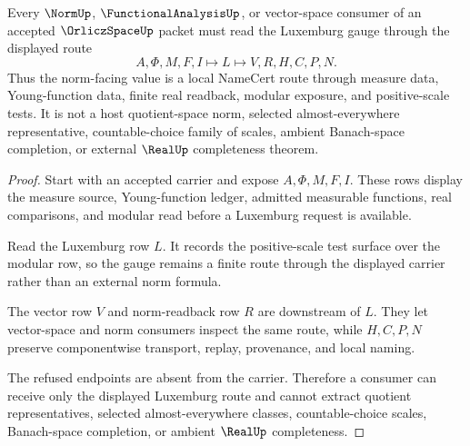 \begin{theorem}
\label{thm:orlicz-space-luxemburg-route}
Every $\NormUp$, $\FunctionalAnalysisUp$, or vector-space consumer of an accepted $\OrliczSpaceUp$ packet must read the Luxemburg gauge through the displayed route
$$
A,\Phi,M,F,I \longmapsto L \longmapsto V,R,H,C,P,N .
$$
Thus the norm-facing value is a local NameCert route through measure data, Young-function data, finite real readback, modular exposure, and positive-scale tests. It is not a host quotient-space norm, selected almost-everywhere representative, countable-choice family of scales, ambient Banach-space completion, or external $\RealUp$ completeness theorem.
\end{theorem}
\begin{proof}
Start with an accepted carrier and expose $A,\Phi,M,F,I$. These rows display the measure source, Young-function ledger, admitted measurable functions, real comparisons, and modular read before a Luxemburg request is available.

Read the Luxemburg row $L$. It records the positive-scale test surface over the modular row, so the gauge remains a finite route through the displayed carrier rather than an external norm formula.

The vector row $V$ and norm-readback row $R$ are downstream of $L$. They let vector-space and norm consumers inspect the same route, while $H,C,P,N$ preserve componentwise transport, replay, provenance, and local naming.

The refused endpoints are absent from the carrier. Therefore a consumer can receive only the displayed Luxemburg route and cannot extract quotient representatives, selected almost-everywhere classes, countable-choice scales, Banach-space completion, or ambient $\RealUp$ completeness.
\end{proof}


\begin{closurestatus}{\OrliczSpaceUp}
  \theoryclosure{\seedClosure}
  \formalstatus{\unformalizedV}
\end{closurestatus}
